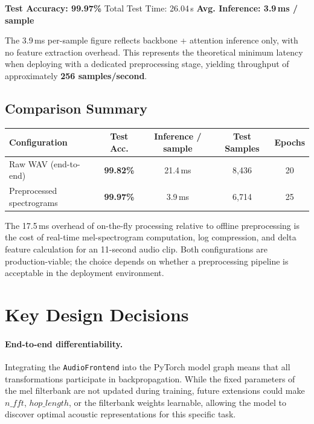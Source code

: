 \documentclass[12pt,a4paper]{article}
\begin{document}
\begin{highlightbox}
  \centering
  \large
  \textbf{Test Accuracy: 99.97\%} \quad
  Total Test Time: 26.04\,s \quad
  \textbf{Avg. Inference: 3.9\,ms / sample}
\end{highlightbox}

The 3.9\,ms per-sample figure reflects backbone + attention inference only, with no feature extraction overhead. This represents the theoretical minimum latency when deploying with a dedicated preprocessing stage, yielding throughput of approximately \textbf{256 samples/second}.

\subsection{Comparison Summary}

\begin{center}
\renewcommand{\arraystretch}{1.5}
\begin{tabular}{lcccc}
  \toprule
  \textbf{Configuration} & \textbf{Test Acc.} & \textbf{Inference / sample} & \textbf{Test Samples} & \textbf{Epochs} \\
  \midrule
  Raw WAV (end-to-end)    & \textbf{99.82\%} & 21.4\,ms & 8{,}436 & 20 \\
  Preprocessed spectrograms & \textbf{99.97\%} & 3.9\,ms  & 6{,}714 & 25 \\
  \bottomrule
\end{tabular}
\end{center}

The 17.5\,ms overhead of on-the-fly processing relative to offline preprocessing is the cost of real-time mel-spectrogram computation, log compression, and delta feature calculation for an 11-second audio clip. Both configurations are production-viable; the choice depends on whether a preprocessing pipeline is acceptable in the deployment environment.

\section{Key Design Decisions}

\paragraph{End-to-end differentiability.} Integrating the \texttt{AudioFrontend} into the PyTorch model graph means that all transformations participate in backpropagation. While the fixed parameters of the mel filterbank are not updated during training, future extensions could make $n\_fft$, $hop\_length$, or the filterbank weights learnable, allowing the model to discover optimal acoustic representations for this specific task.
\end{document}
